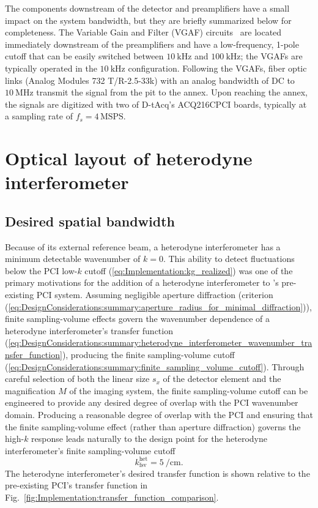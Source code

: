 The components downstream of the detector and preamplifiers
have a small impact on the system bandwidth, but
they are briefly summarized below for completeness.
The Variable Gain and Filter (VGAF) circuits~\cite[Sec.~3.3.3]{dorris_phd}
are located immediately downstream of the preamplifiers and
have a low-frequency, 1-pole cutoff that can be easily switched between
$\SI{10}{\kilo\hertz}$ and $\SI{100}{\kilo\hertz}$;
the VGAFs are typically operated in the $\SI{10}{\kilo\hertz}$ configuration.
Following the VGAFs,
fiber optic links (Analog Modules 732 T/R-2.5-33k)
with an analog bandwidth of DC to $\SI{10}{\mega\hertz}$
transmit the signal from the \diiid \space pit to the annex.
Upon reaching the annex,
the signals are digitized with two of D-tAcq's ACQ216CPCI boards,
typically at a sampling rate of $f_s = 4 \, \text{MSPS}$.


\section{Optical layout of heterodyne interferometer}


\subsection{Desired spatial bandwidth}
Because of its external reference beam, a heterodyne interferometer
has a minimum detectable wavenumber of $k = 0$.
This ability to detect fluctuations
below the PCI low-$k$ cutoff (\ref{eq:Implementation:kg_realized})
was one of the primary motivations
for the addition of a heterodyne interferometer
to \diiid's pre-existing PCI system.
Assuming negligible aperture diffraction
(criterion (\ref{eq:DesignConsiderations:summary:aperture_radius_for_minimal_diffraction})),
finite sampling-volume effects govern the wavenumber dependence
of a heterodyne interferometer's transfer function
(\ref{eq:DesignConsiderations:summary:heterodyne_interferometer_wavenumber_transfer_function}),
producing the finite sampling-volume cutoff
(\ref{eq:DesignConsiderations:summary:finite_sampling_volume_cutoff}).
Through careful selection of both
the linear size $s_x$ of the detector element
and the magnification $M$ of the imaging system,
the finite sampling-volume cutoff can be engineered
to provide any desired degree of overlap
with the PCI wavenumber domain.
Producing a reasonable degree of overlap with the PCI and
ensuring that the finite sampling-volume effect
(rather than aperture diffraction)
governs the high-$k$ response
leads naturally to the design point for
the heterodyne interferometer's finite sampling-volume cutoff
\begin{equation}
  k_{\text{fsv}}^{\text{het}} = \SI{5}{\per\centi\meter}.
  \label{eq:Implementation:kfsv_interferometer_design}
\end{equation}
The heterodyne interferometer's desired transfer function
is shown relative to the pre-existing PCI's transfer function in
Fig.~\ref{fig:Implementation:transfer_function_comparison}.

